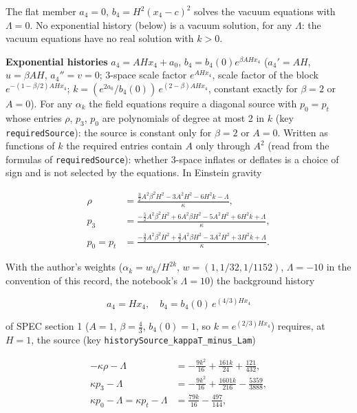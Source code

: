 \documentclass[11pt]{article}
\begin{document}
The flat member $a_4 = 0$, $b_4 = H^2(x_4 - c)^2$ solves the vacuum equations with $\Lambda = 0$. No exponential history (below) is a vacuum solution, for any $\Lambda$: the vacuum equations have no real solution with $k > 0$.

\textbf{Exponential histories} $a_4 = A H x_4 + a_0$, $b_4 = b_4(0)e^{\beta AHx_4}$ ($a_4' = AH$, $u = \beta AH$, $a_4'' = v = 0$; 3-space scale factor $e^{AHx_4}$, scale factor of the block $e^{-(1 - \beta/2)AHx_4}$; $k = (e^{2a_0}/b_4(0))\,e^{(2 - \beta)AHx_4}$, constant exactly for $\beta = 2$ or $A = 0$). For any $\alpha_k$ the field equations require a diagonal source with $p_0 = p_t$ whose entries $\rho$, $p_3$, $p_0$ are polynomials of degree at most 2 in $k$ (key \texttt{required\allowbreak{}Source}): the source is constant only for $\beta = 2$ or $A = 0$. Written as functions of $k$ the required entries contain $A$ only through $A^2$ (read from the formulas of \texttt{required\allowbreak{}Source}): whether 3-space inflates or deflates is a choice of sign and is not selected by the equations. In Einstein gravity

\[
\begin{aligned}
\rho &= \frac{\frac{3}{2} A^2 \beta^2 H^2-3 A^2 H^2-6 H^2 k-\Lambda}{\kappa }, \\
p_3 &= \frac{-\frac{5}{2} A^2 \beta^2 H^2+6 A^2 \beta H^2-5 A^2 H^2+6 H^2 k+\Lambda}{\kappa }, \\
p_0 = p_t &= \frac{-\frac{3}{2} A^2 \beta^2 H^2+\frac{3}{2} A^2 \beta H^2-3 A^2 H^2+3 H^2 k+\Lambda}{\kappa }.
\end{aligned}
\]

With the author's weights ($\alpha_k = w_k/H^{2k}$, $w = (1, 1/32, 1/1152)$, $\Lambda = -10$ in the convention of this record, the notebook's $\Lambda = 10$) the background history

\[
a_4 = Hx_4,\quad b_4 = b_4(0)\,e^{(4/3)Hx_4}
\]

of SPEC section 1 ($A = 1$, $\beta = \tfrac43$, $b_4(0) = 1$, so $k = e^{(2/3)Hx_4}$) requires, at $H = 1$, the source (key \texttt{historyS\allowbreak{}ource\_ka\allowbreak{}ppaT\_min\allowbreak{}us\_Lam})

\[
\begin{aligned}
-\kappa\rho - \Lambda &= -\frac{9 k^2}{16}+\frac{161 k}{24}+\frac{121}{432}, \\
\kappa p_3 - \Lambda &= -\frac{9 k^2}{16}+\frac{1601 k}{216}-\frac{5359}{3888}, \\
\kappa p_0 - \Lambda = \kappa p_t - \Lambda &= \frac{79 k}{16}-\frac{497}{144},
\end{aligned}
\]
\end{document}
